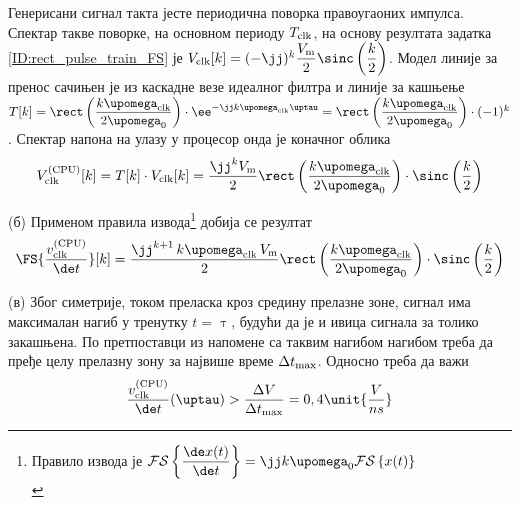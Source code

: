     \RESENJE  Генерисани сигнал такта јесте периодична поворка правоугаоних импулса. 
    Спектар такве поворке, на основном периоду $T_{\rm clk}$, на основу резултата задатка 
    \ref{ID:rect_pulse_train_FS} је $V_{\rm clk}[k] = 
    (-\jj)^k \dfrac{V_{\rm m}}{2} \sinc \left(
    \dfrac{k}{2}
    \right) $.
    Модел линије за пренос сачињен је из каскадне везе идеалног филтра и линије за 
    кашњење $T[k] = \rect \left( \dfrac{k{\upomega_{\rm clk}}}{2\upomega_0} \right) 
    \cdot \ee^{-\jj k {\upomega_{\rm clk}\uptau}} = 
    \rect \left( \dfrac{k{\upomega_{\rm clk}}}{2\upomega_0} \right) 
    \cdot (-1)^k$. Спектар напона на улазу у процесор онда је коначног облика 
    \begin{equation}
        V_{\rm clk}^{\rm (CPU)}[k] 
        = T[k] \cdot V_{\rm clk}[k] 
        =  
        \dfrac{\jj^{k} V_{\rm m}}{2}
        \rect \left( \dfrac{k{\upomega_{\rm clk}}}{2\upomega_0} \right) 
        \cdot
        \sinc \left(
        \dfrac{k}{2} \right)
    \end{equation}

    (б) Применом правила извода\footnote{Правило извода је 
    $
    \mathcal{FS}\left\{\dfrac{\de x(t)}{\de t}\right\} = \jj k \upomega_{\rm 0} 
    \mathcal{FS}\left\{ x(t) \right\} $ \\[1mm]} добија се резултат
    \begin{equation}
        \FS{ \dfrac{v_{\rm clk}^{\rm (CPU)}}{\de t}} [k]
        = 
        \dfrac{ 
        \jj^{k+1} \,
        k \upomega_{\rm clk} \, 
        V_{\rm m} }{2}
        \rect \left( \dfrac{k{\upomega_{\rm clk}}}{2\upomega_0} \right) 
        \cdot
        \sinc \left(
        \dfrac{k}{2} \right)
    \end{equation}

    (в) 
    Због симетрије, током преласка кроз средину прелазне зоне, сигнал има максималан нагиб у тренутку 
    $t = \uptau$, будући да је и ивица сигнала за толико закашњена. По претпоставци из напомене 
    са таквим нагибом нагибом треба да пређе целу прелазну зону за највише време 
    $\Delta t_{\rm max}$. Односно треба да важи
    \begin{equation}
        \dfrac{ v_{\rm clk}^{\rm (CPU)} }{\de t} (\uptau) > \dfrac{\Delta V}{\Delta t_{\rm max}}
        = 0,4\unit{\dfrac{V}{ns}}  \label{eq:\ID.uslov}
    \end{equation}

